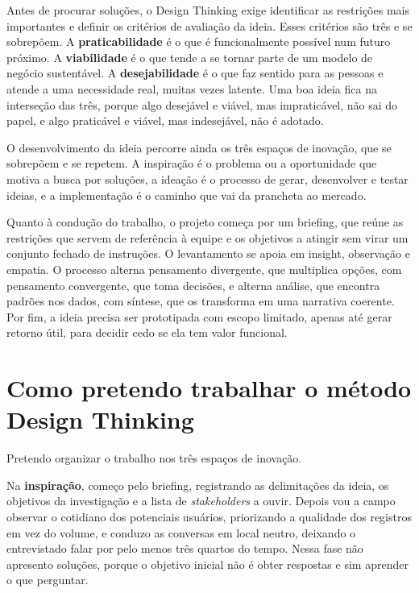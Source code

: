 \documentclass[11pt]{ifscarticle}
\begin{document}
Antes de procurar soluções, o Design Thinking exige identificar as
restrições mais importantes e definir os critérios de avaliação da ideia.
Esses critérios são três e se sobrepõem. A \textbf{praticabilidade} é o que
é funcionalmente possível num futuro próximo. A \textbf{viabilidade} é o que
tende a se tornar parte de um modelo de negócio sustentável. A
\textbf{desejabilidade} é o que faz sentido para as pessoas e atende a uma
necessidade real, muitas vezes latente. Uma boa ideia fica na interseção das
três, porque algo desejável e viável, mas impraticável, não sai do papel, e
algo praticável e viável, mas indesejável, não é adotado.

O desenvolvimento da ideia percorre ainda os três espaços de inovação, que
se sobrepõem e se repetem. A inspiração é o problema ou a oportunidade que
motiva a busca por soluções, a ideação é o processo de gerar, desenvolver e
testar ideias, e a implementação é o caminho que vai da prancheta ao
mercado.

Quanto à condução do trabalho, o projeto começa por um briefing, que reúne
as restrições que servem de referência à equipe e os objetivos a atingir sem
virar um conjunto fechado de instruções. O levantamento se apoia em insight,
observação e empatia. O processo alterna pensamento divergente, que
multiplica opções, com pensamento convergente, que toma decisões, e alterna
análise, que encontra padrões nos dados, com síntese, que os transforma em
uma narrativa coerente. Por fim, a ideia precisa ser prototipada com escopo
limitado, apenas até gerar retorno útil, para decidir cedo se ela tem valor
funcional.

\section{Como pretendo trabalhar o método Design Thinking}

Pretendo organizar o trabalho nos três espaços de inovação.

Na \textbf{inspiração}, começo pelo briefing, registrando as delimitações da
ideia, os objetivos da investigação e a lista de \textit{stakeholders} a
ouvir. Depois vou a campo observar o cotidiano dos potenciais usuários,
priorizando a qualidade dos registros em vez do volume, e conduzo as
conversas em local neutro, deixando o entrevistado falar por pelo menos três
quartos do tempo. Nessa fase não apresento soluções, porque o objetivo
inicial não é obter respostas e sim aprender o que perguntar.
\end{document}
